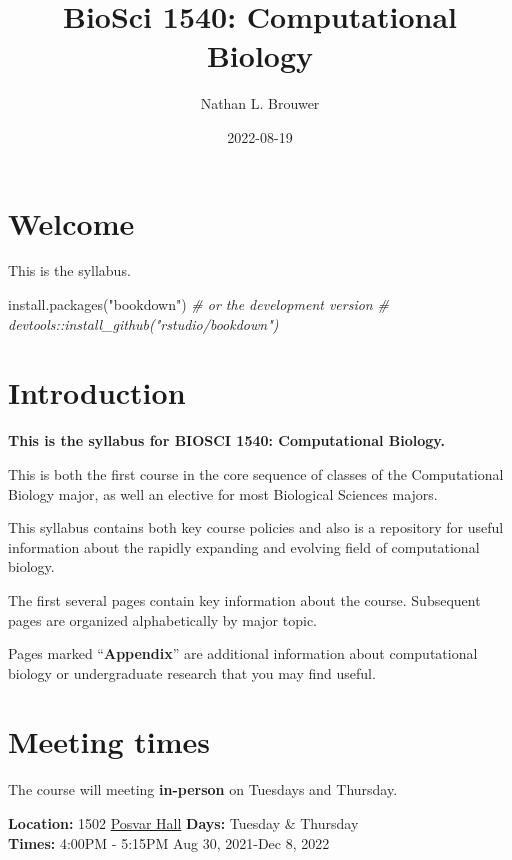 \documentclass[
]{book}
\title{BioSci 1540: Computational Biology}
\author{Nathan L. Brouwer}
\date{2022-08-19}
\newenvironment{Shaded}{\begin{snugshade}}{\end{snugshade}}
\newcommand{\CommentTok}[1]{\textcolor[rgb]{0.56,0.35,0.01}{\textit{#1}}}
\newcommand{\FunctionTok}[1]{\textcolor[rgb]{0.00,0.00,0.00}{#1}}
\newcommand{\NormalTok}[1]{#1}
\newcommand{\StringTok}[1]{\textcolor[rgb]{0.31,0.60,0.02}{#1}}
\begin{document}
\maketitle

{
\setcounter{tocdepth}{1}
\tableofcontents
}
\hypertarget{welcome}{%
\chapter{Welcome}\label{welcome}}

This is the syllabus.

\begin{Shaded}
\begin{Highlighting}[]
\FunctionTok{install.packages}\NormalTok{(}\StringTok{"bookdown"}\NormalTok{)}
\CommentTok{\# or the development version}
\CommentTok{\# devtools::install\_github("rstudio/bookdown")}
\end{Highlighting}
\end{Shaded}

\hypertarget{intro}{%
\chapter{Introduction}\label{intro}}

\textbf{This is the syllabus for BIOSCI 1540: Computational Biology.}

This is both the first course in the core sequence of classes of the Computational Biology major, as well an elective for most Biological Sciences majors.

This syllabus contains both key course policies and also is a repository for useful information about the rapidly expanding and evolving field of computational biology.

The first several pages contain key information about the course. Subsequent pages are organized alphabetically by major topic.

Pages marked ``\textbf{Appendix}'' are additional information about computational biology or undergraduate research that you may find useful.

\hypertarget{meeting-times}{%
\chapter{Meeting times}\label{meeting-times}}

The course will meeting \textbf{in-person} on Tuesdays and Thursday.

\textbf{Location:} 1502 \href{https://www.tour.pitt.edu/tour/wesley-w-posvar-hall}{Posvar Hall}
\textbf{Days:} Tuesday \& Thursday\\
\textbf{Times:} 4:00PM - 5:15PM
Aug 30, 2021-Dec 8, 2022
\end{document}

